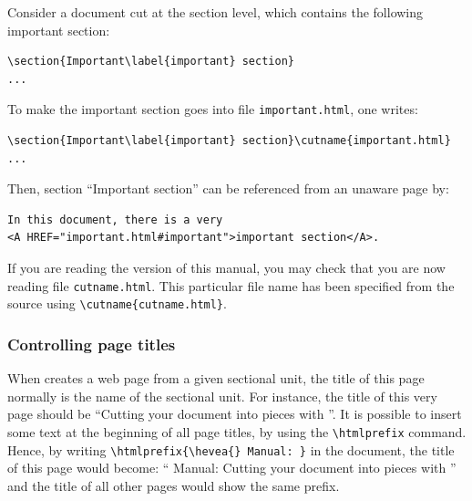 Consider a document cut at the section level, which contains the
following important section:
\begin{verbatim}
\section{Important\label{important} section}
...
\end{verbatim}
To make the important section goes into file \texttt{important.html},
one writes:
\begin{verbatim}
\section{Important\label{important} section}\cutname{important.html}
...
\end{verbatim}
Then, section ``Important section'' can be referenced from
an \hevea{} unaware \html{} page by:
\begin{verbatim}
In this document, there is a very
<A HREF="important.html#important">important section</A>.
\end{verbatim}
\ifhevea
If you are reading the \html{} version of this manual, you may check
that you are now reading file \texttt{cutname.html}.
This particular file name has been specified from the source
using \verb+\cutname{cutname.html}+.
\fi

\subsubsection{Controlling page titles}
When \hacha{} creates a web page from a given sectional unit,
the title of this page normally is the name of the sectional unit.
For instance, the title of this very page should be
``Cutting your document into pieces with \hacha''.
It is possible to insert some text at the beginning of all page
titles, by using the \verb+\htmlprefix+ command.
Hence, by writing
\verb+\htmlprefix{\hevea{} Manual: }+ in the document,
the title of this page would become:
``\hevea{} Manual: Cutting your document into pieces with \hacha''
and the title of all other pages would show the same prefix.

